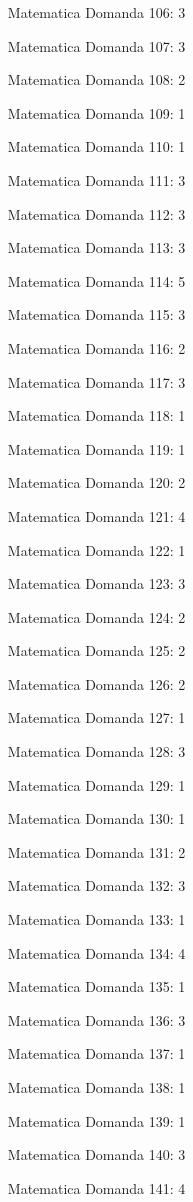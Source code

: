 \documentclass[20pt, a4paper]{article}
\begin{document}
\begin{itemize}[leftmargin=*]
\item [Matematica] Domanda 106: 3
\item [Matematica] Domanda 107: 3
\item [Matematica] Domanda 108: 2
\item [Matematica] Domanda 109: 1
\item [Matematica] Domanda 110: 1
\item [Matematica] Domanda 111: 3
\item [Matematica] Domanda 112: 3
\item [Matematica] Domanda 113: 3
\item [Matematica] Domanda 114: 5
\item [Matematica] Domanda 115: 3
\item [Matematica] Domanda 116: 2
\item [Matematica] Domanda 117: 3
\item [Matematica] Domanda 118: 1
\item [Matematica] Domanda 119: 1
\item [Matematica] Domanda 120: 2
\item [Matematica] Domanda 121: 4
\item [Matematica] Domanda 122: 1
\item [Matematica] Domanda 123: 3
\item [Matematica] Domanda 124: 2
\item [Matematica] Domanda 125: 2
\item [Matematica] Domanda 126: 2
\item [Matematica] Domanda 127: 1
\item [Matematica] Domanda 128: 3
\item [Matematica] Domanda 129: 1
\item [Matematica] Domanda 130: 1
\item [Matematica] Domanda 131: 2
\item [Matematica] Domanda 132: 3
\item [Matematica] Domanda 133: 1
\item [Matematica] Domanda 134: 4
\item [Matematica] Domanda 135: 1
\item [Matematica] Domanda 136: 3
\item [Matematica] Domanda 137: 1
\item [Matematica] Domanda 138: 1
\item [Matematica] Domanda 139: 1
\item [Matematica] Domanda 140: 3
\item [Matematica] Domanda 141: 4

\end{itemize}
\end{document}
